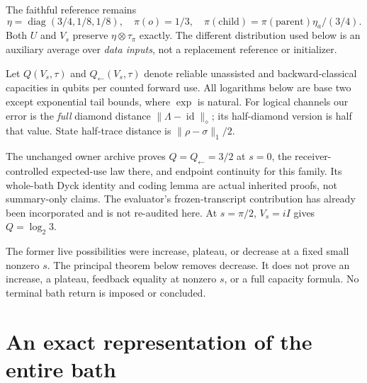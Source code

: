 \documentclass[11pt]{article}
\newcommand{\id}{\operatorname{id}}
\newcommand{\norm}[1]{\lVert #1\rVert}
\begin{document}
The faithful reference remains
\[
 \eta=\operatorname{diag}(3/4,1/8,1/8),\quad
 \pi(o)=1/3,\quad \pi(\mathrm{child})=\pi(\mathrm{parent})\eta_a/(3/4).
\]
Both $U$ and $V_s$ preserve $\eta\otimes\tau_\pi$ exactly. The different distribution used below is an auxiliary average over \emph{data inputs}, not a replacement reference or initializer.

Let $Q(V_s,\tau)$ and $Q_{\leftarrow}(V_s,\tau)$ denote reliable unassisted and backward-classical capacities in qubits per counted forward use. All logarithms below are base two except exponential tail bounds, where $\exp$ is natural. For logical channels our error is the \emph{full} diamond distance $\norm{\Lambda-\id}_\diamond$; its half-diamond version is half that value. State half-trace distance is $\norm{\rho-\sigma}_1/2$.

The unchanged owner archive proves $Q=Q_{\leftarrow}=3/2$ at $s=0$, the receiver-controlled expected-use law there, and endpoint continuity for this family. Its whole-bath Dyck identity and coding lemma are actual inherited proofs, not summary-only claims. The evaluator's frozen-transcript contribution has already been incorporated and is not re-audited here. At $s=\pi/2$, $V_s=iI$ gives $Q=\log_2 3$.

The former live possibilities were increase, plateau, or decrease at a fixed small nonzero $s$. The principal theorem below removes decrease. It does not prove an increase, a plateau, feedback equality at nonzero $s$, or a full capacity formula. No terminal bath return is imposed or concluded.

\section{An exact representation of the entire bath}\label{sec:fock}
\end{document}
